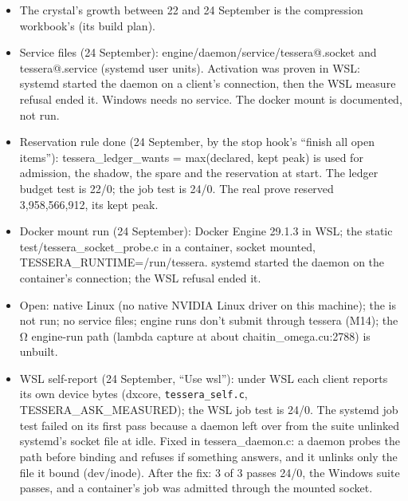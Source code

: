 \begin{enumerate}
\begin{itemize}
\begin{itemize}
\item Fixed: PATH\_\allowbreak{}MAX via linux/limits.h; \_\allowbreak{}GNU\_\allowbreak{}SOURCE in the measure; the timer's return; ENGINE\_\allowbreak{}NOINLINE\_\allowbreak{}HELPER; platform strings guarded; the daemon uses its string table, and the ticket names its signum.
\item WSL's NVML lists no process's memory; tessera\_\allowbreak{}measure\_\allowbreak{}paravirtual refuses, and the daemon exits. The suite passes with 0 warnings.
\item Native Linux is not available here.
\end{itemize}
\item The crystal's growth between 22 and 24 September is the compression workbook's (its build plan).
\item Service files (24 September): engine/daemon/service/tessera@.socket and tessera@.service (systemd user units). Activation was proven in WSL: systemd started the daemon on a client's connection, then the WSL measure refusal ended it. Windows needs no service. The docker mount is documented, not run.
\item Reservation rule done (24 September, by the stop hook's “finish all open items”): tessera\_\allowbreak{}ledger\_\allowbreak{}wants = max(declared, kept peak) is used for admission, the shadow, the spare and the reservation at start. The ledger budget test is 22/0; the job test is 24/0. The real prove reserved 3,958,566,912, its kept peak.
\item Docker mount run (24 September): Docker Engine 29.1.3 in WSL; the static test/tessera\_\allowbreak{}socket\_\allowbreak{}probe.c in a container, socket mounted, TESSERA\_\allowbreak{}RUNTIME=/run/tessera. systemd started the daemon on the container's connection; the WSL refusal ended it.
\item Open: native Linux (no native NVIDIA Linux driver on this machine); the is not run; no service files; engine runs don't submit through tessera (M14); the Ω engine-run path (lambda capture at about chaitin\_\allowbreak{}omega.cu:2788) is unbuilt.
\item WSL self-report (24 September, “Use wsl”): under WSL each client reports its own device bytes (dxcore, \texttt{tessera\_\allowbreak{}self.\allowbreak{}c}, TESSERA\_\allowbreak{}ASK\_\allowbreak{}MEASURED); the WSL job test is 24/0. The systemd job test failed on its first pass because a daemon left over from the suite unlinked systemd's socket file at idle. Fixed in tessera\_\allowbreak{}daemon.c: a daemon probes the path before binding and refuses if something answers, and it unlinks only the file it bound (dev/inode). After the fix: 3 of 3 passes 24/0, the Windows suite passes, and a container's job was admitted through the mounted socket.

\end{itemize}
\end{enumerate}
